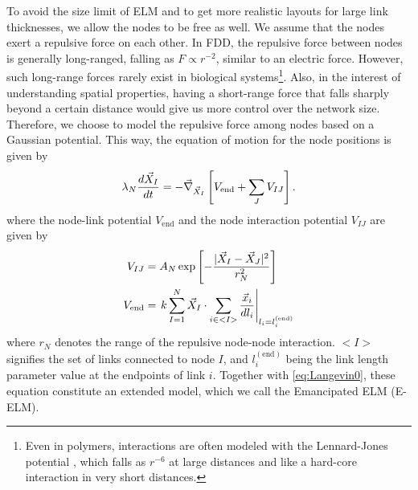 \documentclass[nofootinbib,preprint,endfloats]{revtex4} %
\begin{document}
To avoid the size limit of ELM and to get more realistic layouts for large link thicknesses,
we allow the nodes to be free as well. 
We assume that the nodes exert a repulsive force on each other.  
In FDD, the repulsive force between nodes is generally long-ranged, falling as $F \propto r^{-2}$, similar to an electric force. 
However, such long-range forces rarely exist in biological systems\footnote{Even in polymers, interactions are often modeled with the Lennard-Jones potential \cite{lennard1924determination}, which falls as $r^{-6}$ at large distances and like a hard-core interaction in very short distances. }.
Also, in the interest of understanding spatial properties, having a short-range %
force that falls sharply beyond a certain distance %
would give us more control over the network size. Therefore, we choose to model the repulsive force among nodes based on a Gaussian potential. %
This way, the equation of motion for the node positions is given by
\begin{equation}
    \lambda_N {d\vec{X}_I\over dt} = - \vec{\nabla}_{\vec{X}_I} \left[V_{\mathrm{end}} + \sum_J V_{IJ} \right]. \label{eq:nodes}
\end{equation}
where the node-link potential $V_{\mathrm{end}}$ and the node interaction potential $V_{IJ}$ are given by 
\begin{align}
    V_{IJ} &= %
A_N \exp\left[- {|\vec{X}_I-\vec{X}_J|^2 \over r_N^2}\right]\label{eq:VIJ}\\
 V_{\mathrm{end}} & =\left. k\sum_{I=1}^N \vec{X}_I \cdot \sum_{i\in <I>}  {\vec{x}_i%
 \over dl_i}\right|_{l_i = l^{(\mathrm{end})}_i}
\end{align}
where $r_N$ denotes the range of the repulsive node-node interaction. 
$<I>$ signifies the set of links connected to node $I$, and $l_i^\mathrm{(end)}$ being the link length parameter value at the endpoints of link $i$.
Together with \eqref{eq:Langevin0}, these equation constitute an extended model, which we call the Emancipated ELM (E-ELM). 
\end{document}
